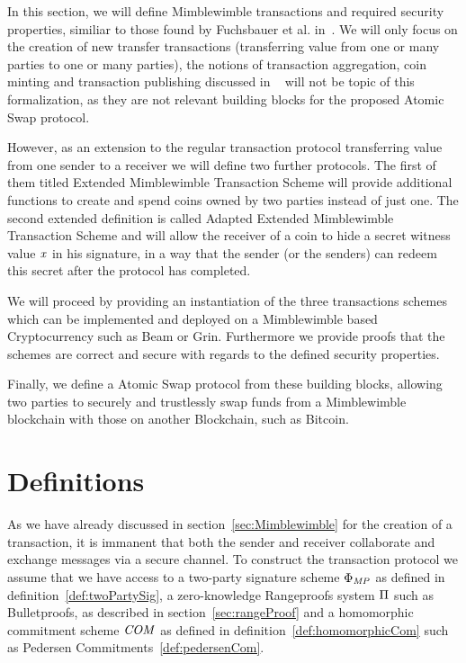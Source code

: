 In this section, we will define Mimblewimble transactions and required security properties, similiar to those found by Fuchsbauer et al. in~\cite{fuchsbauer2019aggregate}. We will only focus on the creation of new transfer transactions
(transferring value from one or many parties to one or many parties), the notions of transaction aggregation, coin minting and transaction publishing discussed in ~\cite{fuchsbauer2019aggregate} will not be topic of this formalization, as
they are not relevant building blocks for the proposed Atomic Swap protocol.

However, as an extension to the regular transaction protocol transferring value from one sender to a receiver we will define two further protocols. The first of them titled Extended Mimblewimble Transaction Scheme
will provide additional functions to create and spend coins owned by two parties instead of just one. The second extended definition is called Adapted Extended Mimblewimble Transaction Scheme and will allow the receiver
of a coin to hide a secret witness value $\mathit{x}$ in his signature, in a way that the sender (or the senders) can redeem this secret after the protocol has completed.

We will proceed by providing an instantiation of the three transactions schemes which can be implemented and deployed on a Mimblewimble based Cryptocurrency such as Beam or Grin. Furthermore we provide proofs
that the schemes are correct and secure with regards to the defined security properties.

Finally, we define a Atomic Swap protocol from these building blocks, allowing two parties to securely and trustlessly swap funds from a Mimblewimble blockchain with those on another Blockchain, such as Bitcoin.


\section{Definitions}\label{sec:atomic-def}

As we have already discussed in section~\ref{sec:Mimblewimble} for the creation of a transaction, it is immanent that both the sender and receiver collaborate and exchange messages via a secure channel.
To construct the transaction protocol we assume that we have access to a two-party signature scheme $\Phi_{\mathit{MP}}$ as defined in definition~\ref{def:twoPartySig}, a zero-knowledge Rangeproofs system $\Pi$
such as Bulletproofs, as described in section~\ref{sec:rangeProof} and a homomorphic commitment scheme $\mathit{COM}$ as defined in definition~\ref{def:homomorphicCom} such as
Pedersen Commitments~\ref{def:pedersenCom}.

